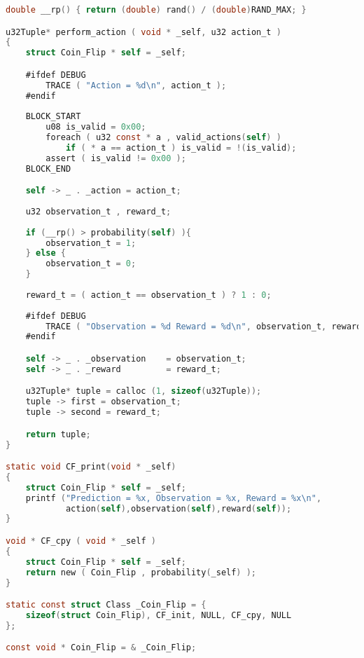 \documentclass[fancychapters]{report}   	%
\begin{document}
\begin{lstlisting}[language=C,caption={coin_flip.c}]
double __rp() { return (double) rand() / (double)RAND_MAX; }

u32Tuple* perform_action ( void * _self, u32 action_t )
{
    struct Coin_Flip * self = _self;

    #ifdef DEBUG
        TRACE ( "Action = %d\n", action_t );
    #endif
    
    BLOCK_START
        u08 is_valid = 0x00; 
        foreach ( u32 const * a , valid_actions(self) )
            if ( * a == action_t ) is_valid = !(is_valid);
        assert ( is_valid != 0x00 );
    BLOCK_END

    self -> _ . _action = action_t;
    
    u32 observation_t , reward_t;
    
    if (__rp() > probability(self) ){
        observation_t = 1;
    } else {
        observation_t = 0;
    }
    
    reward_t = ( action_t == observation_t ) ? 1 : 0;
    
    #ifdef DEBUG
        TRACE ( "Observation = %d Reward = %d\n", observation_t, reward_t );
    #endif

    self -> _ . _observation    = observation_t;
    self -> _ . _reward         = reward_t;

    u32Tuple* tuple = calloc (1, sizeof(u32Tuple));
    tuple -> first = observation_t;
    tuple -> second = reward_t;

    return tuple;
}

static void CF_print(void * _self)
{
    struct Coin_Flip * self = _self;
    printf ("Prediction = %x, Observation = %x, Reward = %x\n",
            action(self),observation(self),reward(self));
}

void * CF_cpy ( void * _self ) 
{
    struct Coin_Flip * self = _self;
    return new ( Coin_Flip , probability(_self) );
}

static const struct Class _Coin_Flip = {
    sizeof(struct Coin_Flip), CF_init, NULL, CF_cpy, NULL
};

const void * Coin_Flip = & _Coin_Flip;
\end{lstlisting}
\end{document}
